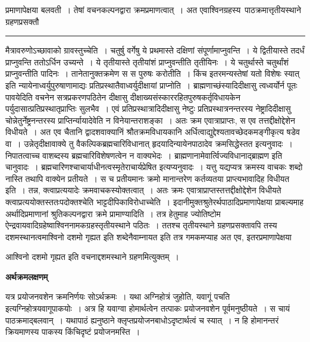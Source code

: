 \documentclass[11pt, openany]{book}
\makeatletter
\newcommand\alfootnote[1]{%
  \begingroup
  \renewcommand\thefootnoteA{}\footnoteA{#1}%
  \addtocounter{footnoteA}{-1}%
  \endgroup
}
\def\blfootnote{\gdef\@thefnmark{}\@footnotetext}
\makeatother
\begin{document}
\newpage
\fancyhead[LO]{लक्षणम् ]}
{\bl\noindent प्रमाणापेक्षया बलवती~। तेषां
वचनकल्पनद्वारा क्रमप्रमाणत्वात्~। अत एवाश्विनग्रहस्य\footnotemark\ पाठक्रमात्तृतीयस्थाने ग्रहणप्रसक्तौ}\\
\hrule
\vspace{3mm}
\noindent
मैत्रावरुणोऽच्छावाको ग्रावस्तुच्चेति~। चतुर्षु  वर्गेषु ये प्रथमास्ते दक्षिणां संपूर्णामाप्नुवन्ति~। ये द्वितीयास्ते तदर्धं प्राप्नुवन्ति ततोऽर्धिन उच्यन्ते~। ये तृतीयास्ते तृतीयांशं प्राप्नुवन्तीति तृतीयिनः~। ये चतुर्थास्ते चतुर्थांशं प्राप्नुवन्तीति पादिनः~। तानेतानुक्तक्रमेण स स पुरुषः करोतीति~। किंच {\qt इतरमन्यस्तेषां यतो विशेषः स्यात्} इति न्यायेनाध्वर्युपुरुषाणामाद्यः प्रतिप्रस्थातैवाध्वर्युदीक्षायां प्राप्नोति~। ब्राह्मणाच्छंस्यादिदीक्षासु त्वध्वर्योर्न पूतः पावयेदिति वचनेन सत्रप्रकरणपठितेन दीक्षासु दीक्षाख्यसंस्काररहितपुरुषकर्तृविधायकेन पर्युदासात्प्रतिप्रस्थातृप्राप्तिः सुलभैव~। एवं प्रतिप्रस्थात्रादिदीक्षासु नेष्टुः प्रतिप्रस्थात्रनन्तरस्य नेष्ट्रादिदीक्षासु चोन्नेतुर्नेष्ट्रनन्तरस्य प्राप्तिर्न्यायादेवेति न विनेयान्तराशङ्का~। अतः क्रम एवात्राप्राप्तः, स एव तत्तद्दीक्षोद्देशेन विधीयते~। अत एव चैतानि द्वादशवाक्यानिं  श्रौतक्रमविधायकानि
अर्धित्वाद्युद्देश्यतावच्छेदकमङ्गीकृत्य षडेव वा~। उन्नेतृदीक्षावाक्ये तु वैकल्पिकब्रह्मचारिविधानात् हृदयादिन्यायेन\footnotemarkA[1] पाठादेव क्रमसिद्धेस्तत इत्यनुवादः~। निपातत्वाच्च वाशब्दस्य ब्रह्मचारिविशेषणत्वेन न वाक्यभेदः~। ब्राह्मणानामेवार्त्विज्यविधानाद्ब्राह्मण इति चानुवादः~। ब्रह्मचारिणश्चाचार्याधीनत्वस्मृतेराचार्यप्रेषित इत्यप्यनुवादः~। यत्तु {\qt यद्यप्यत्र क्रमस्य वाचकः शब्दो नास्ति तथापि वाक्येन प्रतीयते~}। स च प्रतीयमानः क्रमो मानान्तरेण कर्तव्यतया प्राप्त्यभावादिह विधीयत इति~। तन्न, क्त्वाप्रत्ययादेः क्रमवाचकस्योक्तत्वात्~। अतः क्रमः एवात्राप्राप्तस्तत्तद्दीक्षोद्देशेन विधीयते क्त्वाप्रत्ययोक्तस्ततःपदोक्तश्चेति भाट्टदीपिकाविरोधाच्चेति~।
इदानीमुक्तश्रुतेरर्थपाठादिप्रमाणापेक्षया प्राबल्यमाह अर्थादिप्रमाणानां श्रुतिकल्पनद्वारा क्रमे प्रामाण्यादिति~। तत्र हेतुमाह ज्योतिष्टोम ऐन्द्रवायवादिग्रहेष्वाश्विननामकग्रहस्तृतीयस्थाने पठितः~। ततश्च तृतीयस्थाने ग्रहणप्रसक्तावपि तस्य दशमस्थानत्वमाश्विनो दशमो गृह्यत इति शब्देनैवाम्नायत इति तत्र गमकमप्याह अत एव, इतरप्रमाणापेक्षया 
\blfootnote{पाठा०\textemdash\ $^{१}$ग्रहणस्य. }
\alfootnote{टिप्प०\textemdash\ $^{1}$हृदयावदानादिन्यायेनेत्यर्थः}
\newpage
{\bl\noindent आश्विनो दशमो गृह्यत इति वचनाद्दशमस्थाने ग्रहणमित्युक्तम्~। \\
\begin{center}\textbf {अर्थक्रमलक्षणम्}\end{center}

यत्र प्रयोजनवशेन क्रमनिर्णयः सोऽर्थक्रमः~। यथा {\qtl अग्निहोत्रं जुहोति, यवागूं पचति} इत्यग्निहोत्रयवागूपाकयोः~। अत्र हि यवाग्वा होमार्थत्वेन तत्पाकः प्रयोजनवशेन पूर्वमनुष्ठीयते~। स चायं पाठक्रमाद्बलवान्~। यथापाठं ह्यनुष्ठाने क्लृप्तप्रयोजनबाधोऽदृष्टार्थत्वं च स्यात्~। न हि होमानन्तरं क्रियमाणस्य पाकस्य किंचिदृष्टं प्रयोजनमस्ति~।}\\
\end{document}
